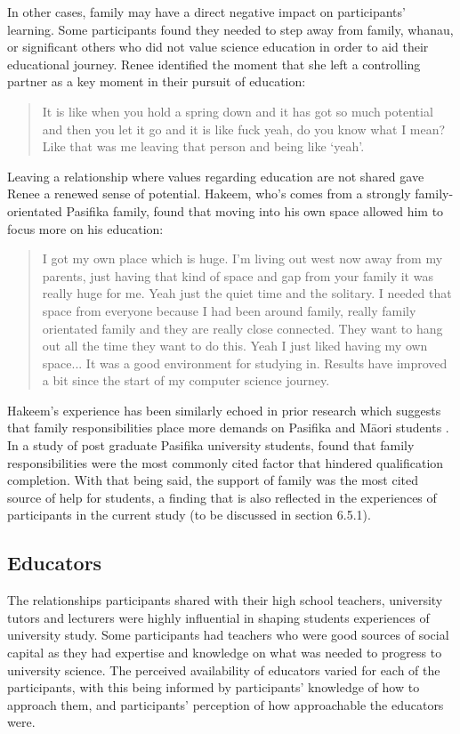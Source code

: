 In other cases, family may have a direct negative impact on participants' learning. Some participants found they needed to step away from family, whanau, or significant others who did not value science education in order to aid their educational journey. Renee identified the moment that she left a controlling partner as a key moment in their pursuit of education: \blockquote{It is like when you hold a spring down and it has got so much potential and then you let it go and it is like fuck yeah, do you know what I mean? Like that was me leaving that person and being like `yeah'.} Leaving a relationship where values regarding education are not shared gave Renee a renewed sense of potential. Hakeem, who's comes from a strongly family-orientated Pasifika family, found that moving into his own space allowed him to focus more on his education:
 \blockquote{I got my own place which is huge. I’m living out west now away from my parents, just having that kind of space and gap from your family it was really huge for me. Yeah just the quiet time and the solitary. I needed that space from everyone because I had been around family, really family orientated family and they are really close connected. They want to hang out all the time they want to do this. Yeah I just liked having my own space... It was a good environment for studying in. Results have improved a bit since the start of my computer science journey.
 }
Hakeem's experience has been similarly echoed in prior research which suggests that family responsibilities place more demands on Pasifika and M\={a}ori students \citep{zepke2011non}. In a study of post graduate Pasifika university students, \cite{theodore2018pacific} found that family responsibilities were the most commonly cited factor that hindered qualification completion. With that being said, the support of family was the most cited source of help for students, a finding that is also reflected in the experiences of participants in the current study (to be discussed in section 6.5.1). 


\subsection{Educators}
The relationships participants shared with their high school teachers, university tutors and lecturers were highly influential in shaping students experiences of university study. Some participants had teachers who were good sources of social capital as they had expertise and knowledge on what was needed to progress to university science. The perceived availability of educators varied for each of the participants, with this being informed by participants' knowledge of how to approach them, and participants' perception of how approachable the educators were. 

